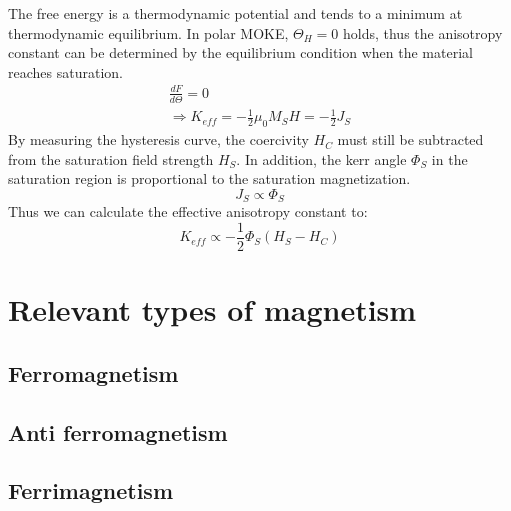 The free energy is a thermodynamic potential and tends to a minimum at thermodynamic equilibrium. In polar MOKE, $\Theta_H = 0$ holds, thus the anisotropy constant can be determined by the equilibrium condition when the material reaches saturation.
\begin{align}
    \frac{dF}{d\Theta} = 0 \\
    \Rightarrow K_{eff} = -\frac{1}{2}\mu_0M_SH = -\frac{1}{2}J_S
\end{align}
By measuring the hysteresis curve, the coercivity $H_C$ must still be subtracted from the saturation field strength $H_S$. In addition, the kerr angle $\Phi_S$ in the saturation region is proportional to the saturation magnetization. 
\begin{equation}
    J_S \propto \Phi_S
\end{equation}
Thus we can calculate the effective anisotropy constant to:
\begin{equation}
    K_{eff} \propto -\frac{1}{2}\Phi_S(H_S-H_C)
\end{equation}


\section{Relevant types of magnetism}
\subsection{Ferromagnetism}


\subsection{Anti ferromagnetism}



\subsection{Ferrimagnetism}